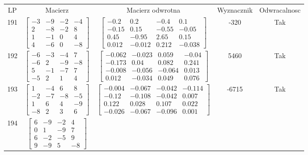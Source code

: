\documentclass[a4paper,12pt]{article}
\begin{document}
\bgroup {} \vspace{0.2in} \begin{tabular}{c c c c c}
LP & Macierz & Macierz odwrotna & Wyznacznik & Odwracalnosc\\
191
&
$\begin{bmatrix} -3 & -9 & -2 & -4 \\ 2 & -8 & -2 & 8 \\ 1 & -1 & 0 & 4 \\ 4 & -6 & 0 & -8 \end{bmatrix}$
&
$\begin{bmatrix} -0.2 & 0.2 & -0.4 & 0.1 \\ -0.15 & 0.15 & -0.55 & -0.05 \\ 0.45 & -0.95 & 2.65 & 0.15 \\ 0.012 & -0.012 & 0.212 & -0.038 \end{bmatrix}$
&
-320
&
Tak
\\
192
&
$\begin{bmatrix} -6 & -3 & -4 & 7 \\ -6 & 2 & -9 & -8 \\ 5 & -1 & -7 & 7 \\ -5 & 2 & 1 & 4 \end{bmatrix}$
&
$\begin{bmatrix} -0.062 & -0.023 & 0.059 & -0.04 \\ -0.173 & 0.04 & 0.082 & 0.241 \\ -0.008 & -0.056 & -0.064 & 0.013 \\ 0.012 & -0.034 & 0.049 & 0.076 \end{bmatrix}$
&
5460
&
Tak
\\
193
&
$\begin{bmatrix} 1 & -4 & 6 & 8 \\ -2 & -7 & -8 & -5 \\ 1 & 6 & 4 & -9 \\ -8 & 2 & 3 & 6 \end{bmatrix}$
&
$\begin{bmatrix} -0.004 & -0.067 & -0.042 & -0.114 \\ -0.12 & -0.108 & -0.042 & 0.007 \\ 0.122 & 0.028 & 0.107 & 0.022 \\ -0.026 & -0.067 & -0.096 & 0.001 \end{bmatrix}$
&
-6715
&
Tak
\\
194
&
$\begin{bmatrix} 6 & -9 & -2 & 4 \\ 0 & 1 & -9 & 7 \\ 6 & -2 & -5 & 9 \\ 9 & -9 & 5 & -8 \end{bmatrix}$

\end{tabular}
\end{document}
